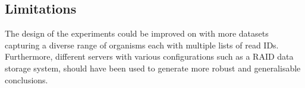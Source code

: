 \subsection{Limitations}
\label{sec:disc:limit}

The design of the experiments could be improved on with more datasets capturing a diverse range of organisms each with multiple lists of read IDs. Furthermore, different servers with various configurations such as a RAID data storage system, should have been used to generate more robust and generalisable conclusions.
